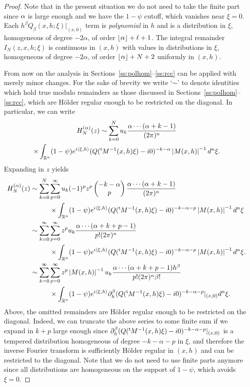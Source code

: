 \documentclass[10pt]{amsart}
\theoremstyle{definition}
\let\cv\alpha
\let\Re\relax
\DeclareMathOperator{\Re}{Re}
\newcommand{\module}[1]{\left|#1\right|}
\newcommand{\plancher}[1]{\left \lfloor #1 \right \rfloor }
\newcommand{\secs}[2]{Sections~\ref{#1}--\ref{#2}}
\renewcommand{\t}{{{}^{\mathrm{t}\mkern-2mu}}}
\begin{document}
\begin{proof}
Note that in the present situation we do not need to take the finite part since $\Re\cv$ is large enough and we have the $1-\psi$ cutoff, which vanishes near $\xi=0$.
Each $h^\beta Q_\beta(x,h;\xi) |_{(x,0)}$
term is \emph{polynomial} in $h$ and is a distribution in $\xi$, homogeneous of degree $-2\cv$, of order $\plancher{\Re\cv}+\ell+1$.
The integral remainder
$I_N(z,x,h;\xi)$ is continuous in $(x,h)$ with values in distributions in $\xi$, homogeneous of degree $-2\cv$,
of order $\plancher{\Re\cv}+N+2$ uniformly in $(x,h)$.

From now on the analysis in \secs{ss:polhom}{ss:rcc} can be applied with merely minor changes. For the sake of brevity we write `$\sim$' to denote identities which hold true modulo remainders as those discussed in \secs{ss:polhom}{ss:rcc}, which are Hölder regular enough to be restricted on the diagonal. In particular, we can write
\begin{multline*}
H_N^{(\cv)}(z) \sim \sum_{k=0}^N u_k \frac{\cv\cdots(\cv+k-1)}{(2\pi)^n}\\
\times\int_{\mathbb{R}^n} (1-\psi) e^{i\left\langle\xi,h \right\rangle}
(Q(\t M^{-1}(x,h)\xi)-i0)^{-k-\cv} \module{M(x,h)}^{-1} d^n\xi.
\end{multline*}
Expanding in $z$ yields
\[
\begin{aligned}
H_N^{(\cv)}(z)&\sim \sum_{k=0}^N\sum_{p=0}^\infty u_k (-1)^pz^p \begin{pmatrix}
-k-\cv
\\
p
\end{pmatrix} \frac{\cv\cdots(\cv+k-1)}{(2\pi)^n} \\
&\hspace*{1cm} \times \int_{\mathbb{R}^n}(1-\psi) e^{i\left\langle\xi,h \right\rangle}
(Q(\t M^{-1}(x,h)\xi)-i0)^{-k-\cv-p} \module{M(x,h)}^{-1} d^n\xi
\\ & \sim \sum_{k=0}^\infty \sum_{p=0}^\infty z^p u_k \frac{\cv\cdots(\cv+k+p-1)}{p!(2\pi)^n} \\
&\hspace*{1cm}\times\int_{\mathbb{R}^n} (1-\psi)e^{i\left\langle\xi,h \right\rangle}
(Q(\t M^{-1}(x,h)\xi)-i0)^{-k-\cv-p} \module{M(x,h)}^{-1} d^n\xi.
\\ & \sim \sum_{k=0}^\infty \sum_{p=0}^\infty z^p \module{M(x,h)}^{-1} u_k \frac{\cv\cdots(\cv+k+p-1)h^\beta}{p!(2\pi)^n\beta!} \\
&\hspace*{1cm}\times\int_{\mathbb{R}^n}(1-\psi) e^{i\left\langle\xi,h \right\rangle}
\partial_h^\beta(Q(\t M^{-1}(x,h)\xi)-i0)^{-k-\cv-p}|_{(x,0)} d^n\xi.
\end{aligned}
\]
Above, the omitted remainders are Hölder regular enough to be restricted on the diagonal. Indeed, we can truncate the above series to some finite sum if we expand in $k+p$ large enough since $\partial_h^\beta(Q(\t M^{-1}(x,h)\xi)-i0)^{-k-\cv-p}|_{(x,0)} $ is a tempered distribution homogeneous of degree $-k-\cv-p $ in $\xi$, and therefore the inverse Fourier transform is sufficiently Hölder regular in $(x,h)$ and can be restricted to the diagonal.
Note that we do not need to use finite parts anymore since all distributions are homogeneous on the support of $1-\psi$, which avoids $\xi=0$.


\end{proof}
\end{document}
